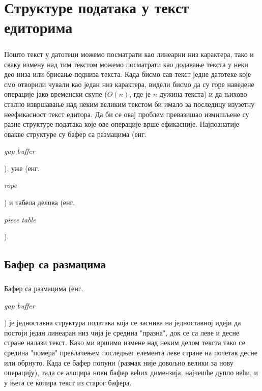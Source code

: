\documentclass[12pt,oneside]{memoir}
\begin{document}
\chapter{Структуре података у текст едиторима}
\paragraph{}
Пошто текст у датотеци можемо посматрати као линеарни низ карактера, 
тако и сваку измену над тим текстом можемо посматрати као додавање текста у
неки део низа или брисање подниза текста. Када бисмо сав текст једне датотеке
које смо отворили чували као један низ карактера, видели бисмо да су горе наведене 
операције јако временски скупе (\(O(n)\), где је \(n\) дужина текста) и да њихово стално 
извршавање над неким великим текстом би имало за последицу изузетну неефикасност текст едитора.
Да би се овај проблем превазишао измишљене су разне структуре података које ове операције
врше ефикасније. Најпознатије овакве структуре су бафер са размацима 
(енг. \begin{latinica}\textit{gap buffer}\end{latinica}), уже (енг. 
\begin{latinica}\textit{rope}\end{latinica}) и табела делова (енг. 
\begin{latinica}\textit{piece table}\end{latinica}).

\section{Бафер са размацима}
\paragraph{}
Бафер са размацима (енг. \begin{latinica}\textit{gap buffer}\end{latinica}) је једноставна структура
података која се заснива на једноставној идеји да постоји један линеаран низ чија је средина
"празна", док се са леве и десне стране налази текст. Како ми вршимо измене над неким делом 
текста тако се средина "помера" превлачењем последњег елемента леве стране на почетак десне
или обрнуто. Када се бафер попуни (размак није довољно велики за нову операцију), тада се 
алоцира нови бафер већих димензија, најчешће дупло већи, и у њега се копира текст из старог
бафера.
\end{document}
